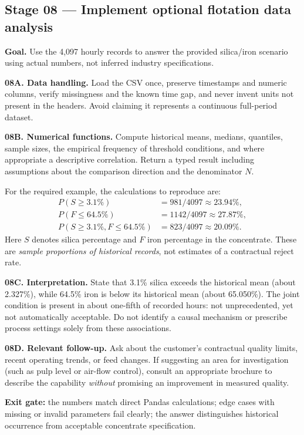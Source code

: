 \documentclass[11pt,a4paper]{article}
\begin{document}
\subsection{Stage 08 --- Implement optional flotation data analysis}
\textbf{Goal.} Use the 4,097 hourly records to answer the provided silica/iron scenario using actual numbers, not inferred industry specifications.

\textbf{08A. Data handling.} Load the CSV once, preserve timestamps and numeric columns, verify missingness and the known time gap, and never invent units not present in the headers. Avoid claiming it represents a continuous full-period dataset.

\textbf{08B. Numerical functions.} Compute historical means, medians, quantiles, sample sizes, the empirical frequency of threshold conditions, and where appropriate a descriptive correlation. Return a typed result including assumptions about the comparison direction and the denominator \(N\).

For the required example, the calculations to reproduce are:
\begin{align}
P(S\ge 3.1\%) &= 981/4097 \approx 23.94\%,\\
P(F\le 64.5\%) &= 1142/4097 \approx 27.87\%,\\
P(S\ge 3.1\%, F\le 64.5\%) &= 823/4097 \approx 20.09\%.
\end{align}
Here \(S\) denotes silica percentage and \(F\) iron percentage in the concentrate. These are \emph{sample proportions of historical records}, not estimates of a contractual reject rate.

\textbf{08C. Interpretation.} State that 3.1\% silica exceeds the historical mean (about 2.327\%), while 64.5\% iron is below its historical mean (about 65.050\%). The joint condition is present in about one-fifth of recorded hours: not unprecedented, yet not automatically acceptable. Do not identify a causal mechanism or prescribe process settings solely from these associations.

\textbf{08D. Relevant follow-up.} Ask about the customer's contractual quality limits, recent operating trends, or feed changes. If suggesting an area for investigation (such as pulp level or air-flow control), consult an appropriate brochure to describe the capability \emph{without} promising an improvement in measured quality.

\textbf{Exit gate:} the numbers match direct Pandas calculations; edge cases with missing or invalid parameters fail clearly; the answer distinguishes historical occurrence from acceptable concentrate specification.
\end{document}
